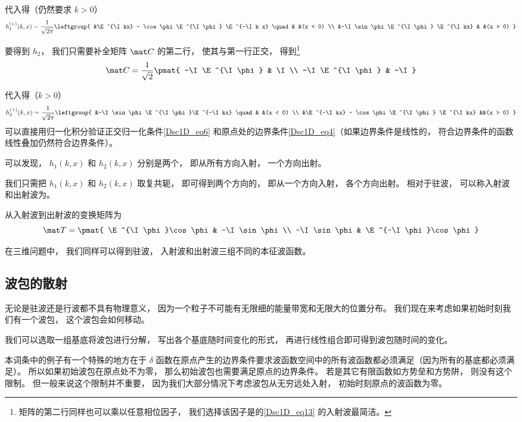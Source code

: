 代入得（仍然要求 $k > 0$）
\begin{equation}\label{Dsc1D_eq11}
h_1^{(+)}(k, x) =  \frac{1}{\sqrt{2\pi}}\leftgroup{
&\E^{\I kx} - \cos\phi \E^{\I\phi} \E^{-\I k x} \quad & &(x < 0) \\
&-\I\sin\phi\E^{\I\phi} \E^{\I kx}  & &(x > 0)
}\end{equation}

要得到 $h_2$， 我们只需要补全矩阵 $\mat C$ 的第二行， 使其与第一行正交， 得到\footnote{矩阵的第二行同样也可以乘以任意相位因子， 我们选择该因子是的\autoref{Dsc1D_eq13} 的入射波最简洁。}
\begin{equation}
\mat C = \frac{1}{\sqrt{2}}\pmat{
-\I\E^{\I \phi} & \I \\
-\I\E^{\I \phi} & -\I
}\end{equation}

代入得（$k > 0$）
\begin{equation}\label{Dsc1D_eq13}
h_2^{(+)}(k, x) =  \frac{1}{\sqrt{2\pi}} \leftgroup{
&-\I\sin\phi\E^{\I\phi}\E^{-\I kx} \quad & &(x < 0) \\
&\E^{-\I kx} - \cos\phi \E^{\I \phi} \E^{\I kx} &&(x > 0)
}\end{equation}
可以直接用归一化积分验证正交归一化条件\autoref{Dsc1D_eq6} 和原点处的边界条件\autoref{Dsc1D_eq4}（如果边界条件是线性的， 符合边界条件的函数线性叠加仍然符合边界条件）。

可以发现， $h_1(k, x)$ 和 $h_2(k, x)$ 分别是两个， 即从所有方向入射， 一个方向出射。

我们只需把 $h_1(k, x)$ 和 $h_2(k, x)$ 取复共轭， 即可得到两个方向的， 即从一个方向入射， 各个方向出射。 相对于驻波， 可以称入射波和出射波为。

从入射波到出射波的变换矩阵为
\begin{equation}
\mat T = \pmat{
\E^{\I\phi}\cos\phi & -\I \sin\phi \\
-\I \sin\phi & \E^{-\I\phi}\cos\phi
}\end{equation}

在三维问题中， 我们同样可以得到驻波， 入射波和出射波三组不同的本征波函数。

\subsection{波包的散射}
无论是驻波还是行波都不具有物理意义， 因为一个粒子不可能有无限细的能量带宽和无限大的位置分布。 我们现在来考虑如果初始时刻我们有一个波包， 这个波包会如何移动。

我们可以选取一组基底将波包进行分解， 写出各个基底随时间变化的形式， 再进行线性组合即可得到波包随时间的变化。

本词条中的例子有一个特殊的地方在于 $\delta$ 函数在原点产生的边界条件要求波函数空间中的所有波函数都必须满足（因为所有的基底都必须满足）。 所以如果初始波包在原点处不为零， 那么初始波包也需要满足原点的边界条件。 若是其它有限函数如方势垒和方势阱， 则没有这个限制。 但一般来说这个限制并不重要， 因为我们大部分情况下考虑波包从无穷远处入射， 初始时刻原点的波函数为零。


